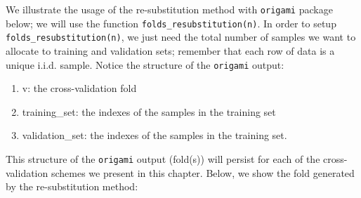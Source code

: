 \documentclass[12pt, krantz2,]{krantz}
\newenvironment{Shaded}{\begin{snugshade}}{\end{snugshade}}
\newcommand{\DecValTok}[1]{\textcolor[rgb]{0.06,0.06,0.06}{#1}}
\newcommand{\KeywordTok}[1]{\textcolor[rgb]{0.27,0.27,0.27}{\textbf{#1}}}
\newcommand{\NormalTok}[1]{#1}
\newcommand{\OperatorTok}[1]{\textcolor[rgb]{0.43,0.43,0.43}{\textbf{#1}}}
\newcommand{\StringTok}[1]{\textcolor[rgb]{0.5,0.5,0.5}{#1}}
\providecommand{\tightlist}{%
  \setlength{\itemsep}{0pt}\setlength{\parskip}{0pt}}
\theoremstyle{definition}
\theoremstyle{definition}
\theoremstyle{definition}
\newcommand{\1}{\mathbbm{1}}
\begin{document}
We illustrate the usage of the re-substitution method with \texttt{origami} package
below; we will use the function \texttt{folds\_resubstitution(n)}. In order to setup
\texttt{folds\_resubstitution(n)}, we just need the total number of samples we want to
allocate to training and validation sets; remember that each row of data is a
unique i.i.d. sample. Notice the structure of the \texttt{origami} output:

\begin{enumerate}
\def\labelenumi{\arabic{enumi}.}
\tightlist
\item
  v: the cross-validation fold
\item
  training\_set: the indexes of the samples in the training set
\item
  validation\_set: the indexes of the samples in the training set.
\end{enumerate}

This structure of the \texttt{origami} output (fold(s)) will persist for each of the
cross-validation schemes we present in this chapter. Below, we show the fold
generated by the re-substitution method:

\begin{Shaded}
\end{Shaded}
\end{document}
